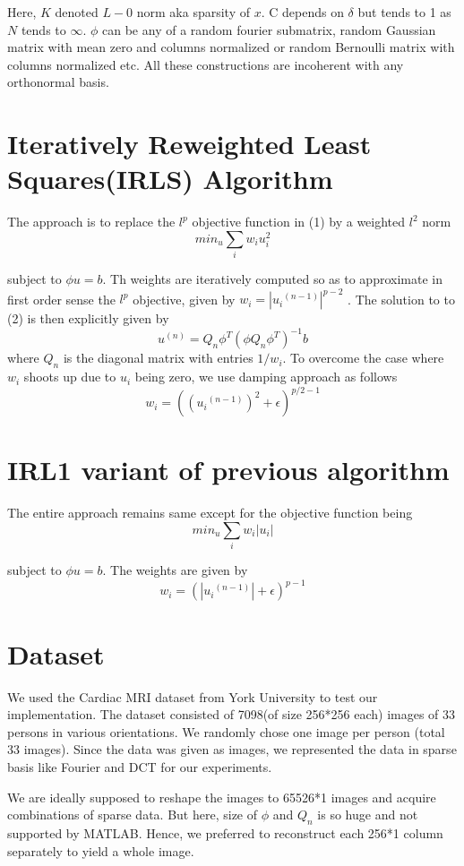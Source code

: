 \documentclass[a4paper]{article}
\begin{document}
\noindent Here, $K$ denoted $L-0$ norm aka sparsity of $x$. C depends on $\delta$ but tends to 1 as $N$ tends to $\infty$. $\phi$ can be any of a random fourier submatrix, random Gaussian matrix with mean zero and columns normalized or random Bernoulli matrix with columns normalized etc. All these constructions are incoherent with any orthonormal basis. 
\section{Iteratively Reweighted Least Squares(IRLS) Algorithm}
The approach is to
replace the $l^p$ objective function in (1) by a weighted $l^2$ norm
\begin{equation}
min_u \sum_i w_i u_i^2 
\end{equation}

subject to  $\phi u=b$.
\newline Th weights are iteratively computed so as to approximate in first order sense the $l^p$ objective, given by $w_i=|{u_i}^{(n-1)}|^{p-2}$ . The solution to to (2) is then explicitly given by 
\begin{equation}
u^{(n)}=Q_n\phi^T(\phi Q_n \phi^T)^{-1}b
\end{equation}
where $Q_n$ is the diagonal matrix with entries $1/w_i$. To overcome the case where $w_i$ shoots up due to $u_i$ being zero, we use damping approach as follows
\begin{equation}
w_i=(({u_i}^{(n-1)})^2+\epsilon)^{p/2 - 1}
\end{equation} 

\section{IRL1 variant of previous algorithm}
The entire approach remains same except for the objective function being 
\begin{equation}
min_u \sum_i w_i |u_i| 
\end{equation}

subject to  $\phi u=b$. The weights are given by 
\begin{equation}
w_i=(|{u_i}^{(n-1)}|+\epsilon)^{p - 1}
\end{equation} 


\section{Dataset}
We used the Cardiac MRI dataset from York University to test our implementation. The dataset consisted of 7098(of size 256*256 each) images of 33 persons in various orientations. We randomly chose  one image per person (total 33 images). Since the data was given as images, we represented the data in sparse basis like Fourier and DCT for our experiments. 
\par We are ideally supposed to reshape the images to 65526*1 images and acquire combinations of sparse data. But here, size of $\phi$ and    $Q_n$ is so huge and not supported by MATLAB. Hence, we preferred to reconstruct each 256*1 column separately to yield a whole image.
\end{document}
